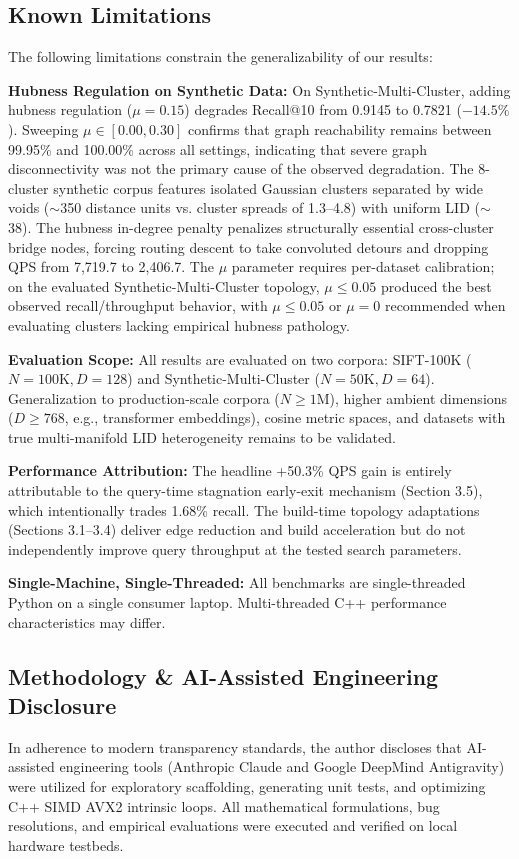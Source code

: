 \documentclass[conference,10pt]{IEEEtran}
\begin{document}
\subsection{Known Limitations}
The following limitations constrain the generalizability of our results:

\textbf{Hubness Regulation on Synthetic Data:} On Synthetic-Multi-Cluster, adding hubness regulation ($\mu=0.15$) degrades Recall@10 from 0.9145 to 0.7821 ($-14.5\%$). Sweeping $\mu \in [0.00, 0.30]$ confirms that graph reachability remains between 99.95\% and 100.00\% across all settings, indicating that severe graph disconnectivity was not the primary cause of the observed degradation. The 8-cluster synthetic corpus features isolated Gaussian clusters separated by wide voids ($\sim$350 distance units vs. cluster spreads of 1.3--4.8) with uniform LID ($\sim$38). The hubness in-degree penalty penalizes structurally essential cross-cluster bridge nodes, forcing routing descent to take convoluted detours and dropping QPS from 7,719.7 to 2,406.7. The $\mu$ parameter requires per-dataset calibration; on the evaluated Synthetic-Multi-Cluster topology, $\mu \le 0.05$ produced the best observed recall/throughput behavior, with $\mu \le 0.05$ or $\mu = 0$ recommended when evaluating clusters lacking empirical hubness pathology.

\textbf{Evaluation Scope:} All results are evaluated on two corpora: SIFT-100K ($N=100\text{K}, D=128$) and Synthetic-Multi-Cluster ($N=50\text{K}, D=64$). Generalization to production-scale corpora ($N \ge 1\text{M}$), higher ambient dimensions ($D \ge 768$, e.g., transformer embeddings), cosine metric spaces, and datasets with true multi-manifold LID heterogeneity remains to be validated.

\textbf{Performance Attribution:} The headline +50.3\% QPS gain is entirely attributable to the query-time stagnation early-exit mechanism (Section 3.5), which intentionally trades 1.68\% recall. The build-time topology adaptations (Sections 3.1--3.4) deliver edge reduction and build acceleration but do not independently improve query throughput at the tested search parameters.

\textbf{Single-Machine, Single-Threaded:} All benchmarks are single-threaded Python on a single consumer laptop. Multi-threaded C++ performance characteristics may differ.

\subsection{Methodology \& AI-Assisted Engineering Disclosure}
In adherence to modern transparency standards, the author discloses that AI-assisted engineering tools (Anthropic Claude and Google DeepMind Antigravity) were utilized for exploratory scaffolding, generating unit tests, and optimizing C++ SIMD AVX2 intrinsic loops. All mathematical formulations, bug resolutions, and empirical evaluations were executed and verified on local hardware testbeds.
\end{document}
